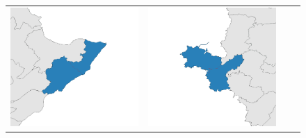 \begin{figure}[p]
\begin{tabularx}{1\textwidth}{XXXX}
\includegraphics[width=1\linewidth]{images/ch6/mergefocus/13}&
\includegraphics[width=1\linewidth]{images/ch6/mergefocus/14}&

\end{tabularx}
\end{figure}
